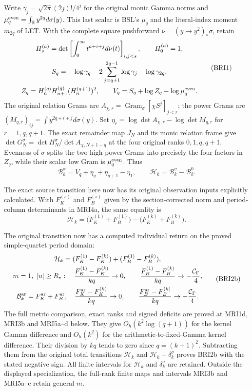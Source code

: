 \documentclass[11pt,a4paper]{article}
\begin{document}
Write $\gamma_j=\sqrt{2\pi}(2j)!/4^j$ for the original monic
Gamma norms and $\mu_q^{\rm even}=\int_{\mathbb R}y^{2q}d\sigma(y)$.
This last scalar is BSL's $\mu_q$ and the literal-index moment
$m_{2q}$ of LET. With the complete square pushforward
$\nu=(y\mapsto y^2)_*\sigma$, retain
\[
\begin{gathered}
 H_s^{(a)}=\det\left[\int_0^\infty t^{a+i+j}d\nu(t)\right]_{i,j<s},
 \qquad H_0^{(a)}=1,\\
 S_q=-\log\gamma_q-2\sum_{j=q+1}^{2q-1}\log\gamma_j
                                             -\log\gamma_{2q},\\
 Z_q=H_n^{(q)}H_{n+1}^{(q)}(H_n^{(q+1)})^2,
 \qquad V_q=S_q+\log Z_q-\log\mu_q^{\rm even}.
\end{gathered}\tag{BRI1}
\]
The original relation Grams are
$A_{\chi,r}=\operatorname{Gram}_\sigma[\chi S^j]_{j<r}$;
the power Grams are
$(M_{q,r})_{ij}=\int y^{2q+i+j}d\sigma(y)$.
Set $\eta_r=\log\det A_{\chi,r}-\log\det M_{q,r}$ for
$r=1,q,q+1$. The exact remainder map $J_N$ and its monic
relation frame give $\det G_N^\sigma=\det H_N^\sigma/
\det A_{\chi,N+1-q}$ at the four original ranks $0,1,q,q+1$.
Evenness of $\sigma$ splits the two high power Grams into precisely
the four factors in $Z_q$, while their scalar low Gram is
$\mu_q^{\rm even}$. Thus
\[
 \mathcal B_k^\sigma=V_q+\eta_q+\eta_{q+1}-\eta_1,
 \qquad \mathcal H_k=\mathcal B_k^\sigma-\mathcal B_k^0.
 \tag{BRI2}
\]

The exact source transition here now has its original observation
inputs explicitly calculated. With $F_K^{(s)}$ and $F_B^{(s)}$
given by the section-corrected norm and period-column determinants
in MRI4a, the same equality is
\[
 \mathcal H_k
   =\bigl(F_K^{(1)}+F_B^{(1)}\bigr)
       -\bigl(F_K^{(k)}+F_B^{(k)}\bigr).
 \tag{BRI2a}
\]

The original transition now has a computed individual return
on the proved simple-quartet period domain:
\[
\begin{gathered}
 \mathcal H_k=(F_K^{(1)}-F_K^{(k)})+(F_B^{(1)}-F_B^{(k)}),\\
 m=1,\ |u|\ge R_*:\quad
 \frac{F_K^{(1)}-F_K^{(k)}}{kq}\to0,\qquad
 \frac{F_B^{(1)}-F_B^{(k)}}{kq}\to-\frac{\mathcal C_\Gamma}{4},\\
 \mathcal B_k^{\rm ar}=F_K^{\rm ar}+F_B^{\rm ar},\quad
 \frac{F_K^{\rm ar}-F_K^{(k)}}{kq}\to0,\qquad
 \frac{F_B^{\rm ar}-F_B^{(k)}}{kq}\to-\frac{\mathcal C_\Gamma}{4}.
\end{gathered}\tag{BRI2b}
\]
The full metric comparison, exact ranks and signed deficits
are proved at MRI1d, MRI3b and MRI5a--d below. They give
$O_h(k^2\log(q+1))$ for the kernel Gamma difference and
$O_h(k^2)$ for the arithmetic-to-fixed-Gamma kernel difference.
Their division by $kq$ tends to zero since $q=(k+1)^2$.
Subtracting them from the original total transitions
$\mathcal H_k$ and $\mathcal H_k+\delta_k^\sigma$ proves
BRI2b with the stated negative sign. All finite intervals
for $\mathcal H_k$ and $\delta_k^\sigma$ are retained.
Outside the displayed specialization, the full-rank finite
maps and intervals MRI3b and MRI5a--c retain general $m$.
\end{document}
